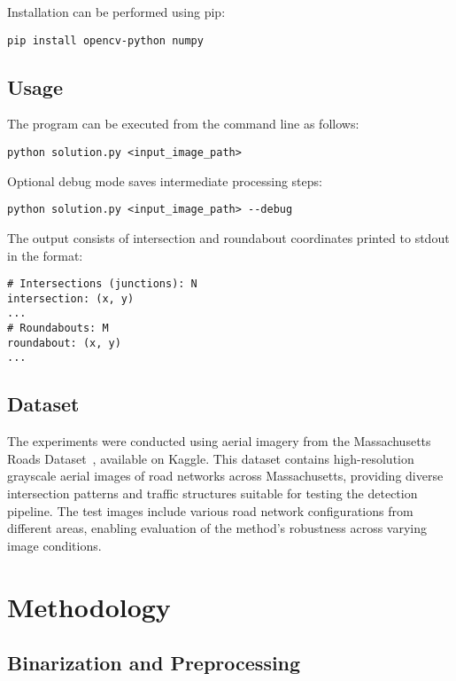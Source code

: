 \documentclass[conference]{IEEEtran}
\begin{document}
Installation can be performed using pip:

\begin{verbatim}
pip install opencv-python numpy
\end{verbatim}

\subsection{Usage}

The program can be executed from the command line as follows:

\begin{verbatim}
python solution.py <input_image_path>
\end{verbatim}

Optional debug mode saves intermediate processing steps:

\begin{verbatim}
python solution.py <input_image_path> --debug
\end{verbatim}

The output consists of intersection and roundabout coordinates printed to stdout in the format:
\begin{verbatim}
# Intersections (junctions): N
intersection: (x, y)
...
# Roundabouts: M
roundabout: (x, y)
...
\end{verbatim}

\subsection{Dataset}

The experiments were conducted using aerial imagery from the Massachusetts Roads Dataset~\cite{massachusetts_dataset}, available on Kaggle. This dataset contains high-resolution grayscale aerial images of road networks across Massachusetts, providing diverse intersection patterns and traffic structures suitable for testing the detection pipeline. The test images include various road network configurations from different areas, enabling evaluation of the method's robustness across varying image conditions.

\section{Methodology}

\subsection{Binarization and Preprocessing}
\end{document}
